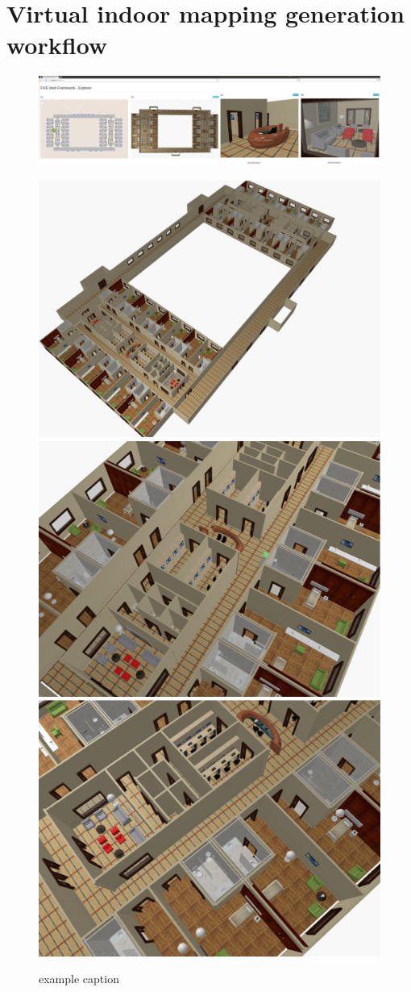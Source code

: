 \section{Virtual indoor mapping generation workflow}\label{workflow}


\begin{figure}[ptb] %
   \centering
   \includegraphics[width=\linewidth]{images/ward/ward} 
   
   \includegraphics[width=0.327\linewidth]{images/ward/ward1} 
   \includegraphics[width=0.327\linewidth]{images/ward/ward4} 
   \includegraphics[width=0.327\linewidth]{images/ward/ward5} 
   \caption{example caption}
   \label{fig:example}
\end{figure}




